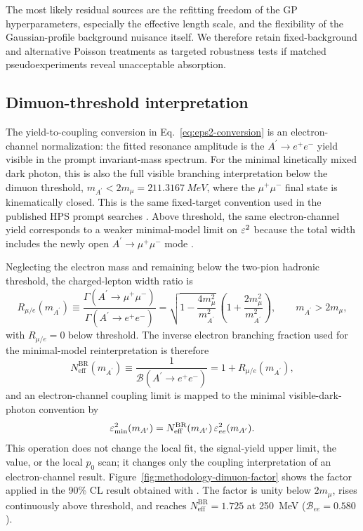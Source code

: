 The most likely residual sources are the refitting freedom of the GP hyperparameters,
especially the effective length scale, and the flexibility of the Gaussian-profile
background nuisance itself. We therefore retain fixed-background and alternative
Poisson treatments as targeted robustness tests if matched pseudoexperiments reveal
unacceptable absorption.

\subsection{Dimuon-threshold interpretation}
\label{sec:methodology-dimuon-threshold}

The yield-to-coupling conversion in Eq.~\eqref{eq:eps2-conversion} is an
electron-channel normalization: the fitted resonance amplitude is the
$A^\prime\to e^+e^-$ yield visible in the prompt invariant-mass spectrum. For the
minimal kinetically mixed dark photon, this is also the full visible branching
interpretation below the dimuon threshold, $m_{A^\prime}<2m_\mu=\SI{211.3167}{MeV}$,
where the $\mu^+\mu^-$ final state is kinematically closed. This is the same
fixed-target convention used in the published HPS prompt searches
\cite{EssigEtAl2011,HPS2015DarkPhoton,HPS2016PromptLong}. Above threshold, the same
electron-channel yield corresponds to a weaker minimal-model limit on $\varepsilon^2$ because
the total width includes the newly open $A^\prime\to\mu^+\mu^-$ mode
\cite{Holdom1986,Fabbrichesi2020DarkPhoton}.

Neglecting the electron mass and remaining below the two-pion hadronic threshold, the
charged-lepton width ratio is
\begin{equation}
R_{\mu/e}(m_{A^\prime})
\equiv
\frac{\Gamma(A^\prime\to\mu^+\mu^-)}
{\Gamma(A^\prime\to e^+e^-)}
=
\sqrt{1-\frac{4m_\mu^2}{m_{A^\prime}^2}}\,
\left(1+\frac{2m_\mu^2}{m_{A^\prime}^2}\right),
\qquad m_{A^\prime}>2m_\mu,
\label{eq:dimuon-width-ratio}
\end{equation}
with $R_{\mu/e}=0$ below threshold. The inverse electron branching fraction used for
the minimal-model reinterpretation is therefore
\begin{equation}
N_{\mathrm{eff}}^{\mathrm{BR}}(m_{A^\prime})
\equiv
\frac{1}{\mathcal{B}(A^\prime\to e^+e^-)}
=
1+R_{\mu/e}(m_{A^\prime}),
\label{eq:dimuon-neff}
\end{equation}
and an electron-channel coupling limit is mapped to the minimal visible-dark-photon
convention by
\begin{equation}
\varepsilon^2_{\mathrm{min}}(m_{A^\prime})
=
N_{\mathrm{eff}}^{\mathrm{BR}}(m_{A^\prime})\,\varepsilon^2_{ee}(m_{A^\prime}).
\label{eq:dimuon-eps2-map}
\end{equation}
This operation does not change the local fit, the signal-yield upper limit, the
\CLs{} value, or the local $p_0$ scan; it changes only the coupling interpretation of
an electron-channel result. Figure~\ref{fig:methodology-dimuon-factor} shows the
factor applied in the 90\% CL result obtained with \CLs{}. The factor is unity below
$2m_\mu$, rises continuously above threshold, and reaches
$N_{\mathrm{eff}}^{\mathrm{BR}}=1.725$ at \SI{250}{MeV}
($\mathcal{B}_{ee}=0.580$).

